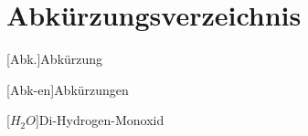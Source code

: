 
\chapter*{Abkürzungsverzeichnis}

\begin{acronym}[DHBW]
    [Abk.]{Abkürzung}

    [Abk-en]{Abkürzungen}

    [\ensuremath{H_2O}]{Di-Hydrogen-Monoxid}
\end{acronym}
